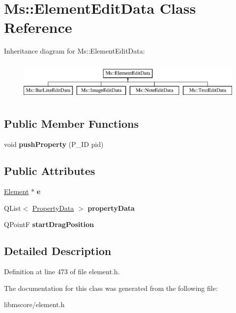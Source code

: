 \hypertarget{class_ms_1_1_element_edit_data}{}\section{Ms\+:\+:Element\+Edit\+Data Class Reference}
\label{class_ms_1_1_element_edit_data}
Inheritance diagram for Ms\+:\+:Element\+Edit\+Data\+:\begin{figure}[H]
\begin{center}
\leavevmode
\includegraphics[height=2.000000cm]{class_ms_1_1_element_edit_data}
\end{center}
\end{figure}
\subsection*{Public Member Functions}
\begin{DoxyCompactItemize}
\item 
\mbox{\label{class_ms_1_1_element_edit_data_a3c81fa3ae6fe219d86c04f448c23f111}} 
void {\bfseries push\+Property} (P\+\_\+\+ID pid)
\end{DoxyCompactItemize}
\subsection*{Public Attributes}
\begin{DoxyCompactItemize}
\item 
\mbox{\label{class_ms_1_1_element_edit_data_a4a5b2a5182a4a984de50d65dcd5660f3}} 
\hyperlink{class_ms_1_1_element}{Element} $\ast$ {\bfseries e}
\item 
\mbox{\label{class_ms_1_1_element_edit_data_aa543bb38e2a53f697dc9973bce7b4a44}} 
Q\+List$<$ \hyperlink{struct_ms_1_1_property_data}{Property\+Data} $>$ {\bfseries property\+Data}
\item 
\mbox{\label{class_ms_1_1_element_edit_data_a75ee4ddf615b8783eab85478ee5c7987}} 
Q\+PointF {\bfseries start\+Drag\+Position}
\end{DoxyCompactItemize}


\subsection{Detailed Description}


Definition at line 473 of file element.\+h.



The documentation for this class was generated from the following file\+:\begin{DoxyCompactItemize}
\item 
libmscore/element.\+h\end{DoxyCompactItemize}
